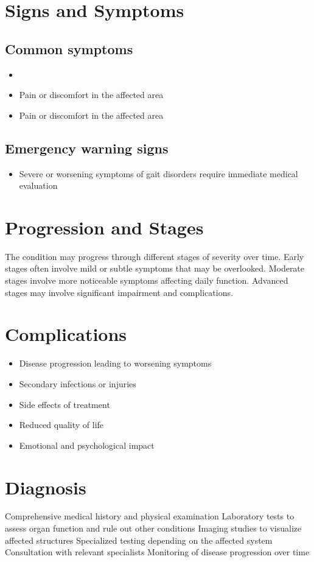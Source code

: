 \section{Signs and Symptoms}

\subsection{Common symptoms}
\begin{itemize}[noitemsep]
  \item \item Pain or discomfort in the affected area    \item Pain or discomfort in the affected area
  \end{itemize}

\subsection{Emergency warning signs}
\begin{itemize}[noitemsep]
  \item Severe or worsening symptoms of gait disorders require immediate medical evaluation
\end{itemize}
\section{Progression and Stages}
The condition may progress through different stages of severity over time. Early stages often involve mild or subtle symptoms that may be overlooked. Moderate stages involve more noticeable symptoms affecting daily function. Advanced stages may involve significant impairment and complications.
\section{Complications}
\begin{itemize}[noitemsep]
  \item Disease progression leading to worsening symptoms
  \item Secondary infections or injuries
  \item Side effects of treatment
  \item Reduced quality of life
  \item Emotional and psychological impact
\end{itemize}
\section{Diagnosis}
Comprehensive medical history and physical examination Laboratory tests to assess organ function and rule out other conditions Imaging studies to visualize affected structures Specialized testing depending on the affected system Consultation with relevant specialists Monitoring of disease progression over time

